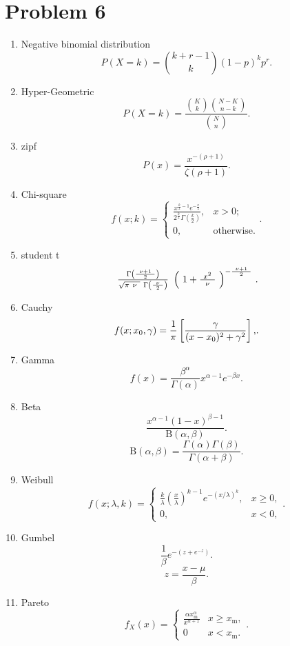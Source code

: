 \documentclass{article}
\begin{document}
    \section{Problem 6}
    \begin{enumerate}
        \item Negative binomial distribution\\
            \[
            P(X=k) = \binom{k+r-1}{k}(1-p)^{k}p^{r}
            .\] 
        \item Hyper-Geometric
            \[
            P(X=k) = \frac{\binom{K}{k}\binom{N-K}{n-k}}{\binom{N}{n}}
            .\] 
        \item zipf
            \[
            P(x) = \frac{x^{-(\rho+1)}}{\zeta (\rho +1)}
            .\] 
        \item Chi-square
            \[
            f(x;k) =
            \begin{cases}
            \frac{x^{\frac{k}{2}-1}e^{-\frac{x}{2}}}{2^{\frac{k}{2}}\Gamma (\frac{k}{2})}, & x > 0;\\
                0, & \text{otherwise.}
            \end{cases}
            .\] 
        \item student t
            \[
            {\displaystyle \textstyle \ {\frac {\Gamma \left({\frac {\ \nu +1\ }{2}}\right)}{{\sqrt {\pi \ \nu \ }}\ \Gamma \left({\frac {\nu }{\ 2\ }}\right)}}\ \left(\ 1+{\frac {~x^{2}\ }{\nu }}\ \right)^{-{\frac {\ \nu +1\ }{2}}}\ }
            .\] 
        \item Cauchy
            \[
            {\displaystyle f(x;x_{0},\gamma )={1 \over \pi }\left[{\gamma  \over (x-x_{0})^{2}+\gamma ^{2}}\right],}
            .\] 
        \item Gamma
            \[
            {\displaystyle f(x)={\frac {\beta ^{\alpha }}{\Gamma (\alpha )}}x^{\alpha -1}e^{-\beta x}}
            .\] 
        \item Beta
            \[
            {\displaystyle {\frac {x^{\alpha -1}(1-x)^{\beta -1}}{\mathrm {B} (\alpha ,\beta )}}\!}
            .\] 
            \[
            {\displaystyle \mathrm {B} (\alpha ,\beta )={\frac {\Gamma (\alpha )\Gamma (\beta )}{\Gamma (\alpha +\beta )}}}
            .\] 
        \item Weibull
            \[
            {\displaystyle f(x;\lambda ,k)={\begin{cases}{\frac {k}{\lambda }}\left({\frac {x}{\lambda }}\right)^{k-1}e^{-(x/\lambda )^{k}},&x\geq 0,\\0,&x<0,\end{cases}}}
            .\] 
        \item Gumbel
            \[
            {\displaystyle {\frac {1}{\beta }}e^{-(z+e^{-z})}}
            .\] 
            \[
            {\displaystyle z={\frac {x-\mu }{\beta }}}
            .\] 
        \item Pareto
            \[
            {\displaystyle f_{X}(x)={\begin{cases}{\frac {\alpha x_{\mathrm {m} }^{\alpha }}{x^{\alpha +1}}}&x\geq x_{\mathrm {m} },\\0&x<x_{\mathrm {m} }.\end{cases}}}
            .\] 
    \end{enumerate}
\end{document}

